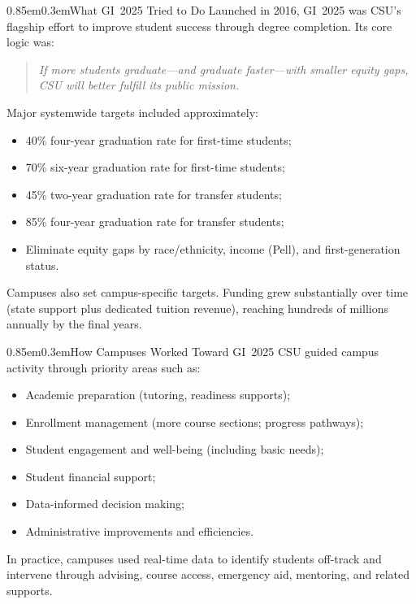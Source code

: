 \documentclass[11pt,letterpaper]{article}
\makeatletter
\renewcommand\subsection{\@startsection{subsection}{2}{\z@}%
  {0.85em}{0.3em}{\normalsize\bfseries}}
\makeatother
\begin{document}
\subsection{What GI~2025 Tried to Do}
Launched in 2016, GI~2025 was CSU's flagship effort to improve student success through degree completion. Its core logic was:
\begin{quote}
\textit{If more students graduate---and graduate faster---with smaller equity gaps, CSU will better fulfill its public mission.}
\end{quote}

Major systemwide targets included approximately:
\begin{itemize}
  \item 40\% four-year graduation rate for first-time students;
  \item 70\% six-year graduation rate for first-time students;
  \item 45\% two-year graduation rate for transfer students;
  \item 85\% four-year graduation rate for transfer students;
  \item Eliminate equity gaps by race/ethnicity, income (Pell), and first-generation status.
\end{itemize}
Campuses also set campus-specific targets. Funding grew substantially over time (state support plus dedicated tuition revenue), reaching hundreds of millions annually by the final years.

\subsection{How Campuses Worked Toward GI~2025}
CSU guided campus activity through priority areas such as:
\begin{itemize}
  \item Academic preparation (tutoring, readiness supports);
  \item Enrollment management (more course sections; progress pathways);
  \item Student engagement and well-being (including basic needs);
  \item Student financial support;
  \item Data-informed decision making;
  \item Administrative improvements and efficiencies.
\end{itemize}
In practice, campuses used real-time data to identify students off-track and intervene through advising, course access, emergency aid, mentoring, and related supports.
\end{document}
